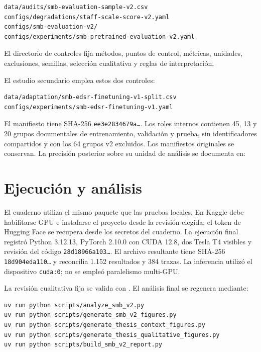 \begin{verbatim}
data/audits/smb-evaluation-sample-v2.csv
configs/degradations/staff-scale-score-v2.yaml
configs/smb-evaluation-v2/
configs/experiments/smb-pretrained-evaluation-v2.yaml
\end{verbatim}

El directorio de controles fija métodos, puntos de control, métricas, unidades, exclusiones,
semillas, selección cualitativa y reglas de interpretación.

El estudio secundario emplea estos dos controles:

\begin{verbatim}
data/adaptation/smb-edsr-finetuning-v1-split.csv
configs/experiments/smb-edsr-finetuning-v1.yaml
\end{verbatim}

El manifiesto tiene SHA-256 \texttt{ee3e2834679a\ldots}. Los roles internos contienen 45, 13 y 20
grupos documentales de entrenamiento, validación y prueba, sin identificadores compartidos y con
los 64 grupos v2 excluidos. Los manifiestos originales se conservan. La precisión posterior sobre
su unidad de análisis se documenta en:
\begin{quote}
  \small{}
\end{quote}

\section{Ejecución y análisis}
El cuaderno  utiliza el mismo paquete que las
pruebas locales. En Kaggle debe habilitarse GPU e instalarse el proyecto desde la revisión elegida;
el token de Hugging Face se recupera desde los secretos del cuaderno. La ejecución final registró
Python 3.12.13, PyTorch 2.10.0 con CUDA 12.8, dos Tesla T4 visibles y revisión del código
\texttt{28d18966a103\ldots}. El archivo resultante tiene SHA-256
\texttt{18d904eda110\ldots} y reconcilia 1.152 resultados y 384 trazas.
La inferencia utilizó el dispositivo \texttt{cuda:0}; no se empleó paralelismo multi-GPU.

La revisión cualitativa fija se valida con
. El análisis final se regenera mediante:

\begin{verbatim}
uv run python scripts/analyze_smb_v2.py
uv run python scripts/generate_smb_v2_figures.py
uv run python scripts/generate_thesis_context_figures.py
uv run python scripts/generate_thesis_qualitative_figures.py
uv run python scripts/build_smb_v2_report.py
\end{verbatim}

